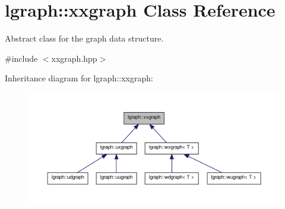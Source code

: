 \hypertarget{classlgraph_1_1xxgraph}{\section{lgraph\-:\-:xxgraph Class Reference}
\label{classlgraph_1_1xxgraph}
}


Abstract class for the graph data structure.  




{\ttfamily \#include $<$xxgraph.\-hpp$>$}



Inheritance diagram for lgraph\-:\-:xxgraph\-:
\nopagebreak
\begin{figure}[H]
\begin{center}
\leavevmode
\includegraphics[width=350pt]{classlgraph_1_1xxgraph__inherit__graph}
\end{center}
\end{figure}

